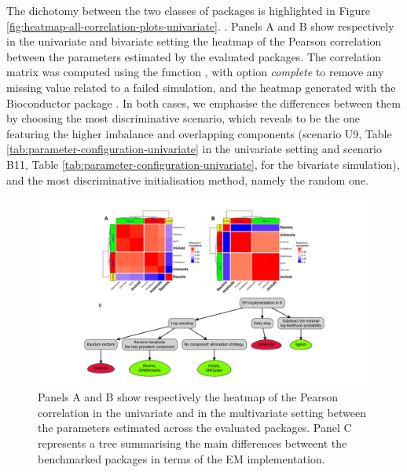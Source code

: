 The dichotomy between the two classes of packages is highlighted in Figure \ref{fig:heatmap-all-correlation-plots-univariate}.
\color{green}. Panels A and B show respectively in the univariate and bivariate setting the heatmap of the Pearson correlation between the parameters estimated by the evaluated packages. The correlation matrix was computed using the function
, with option \emph{complete} to remove any missing value related to a failed simulation, and the heatmap generated with the Bioconductor package . In both cases, we emphasise the differences between them by choosing the most discriminative scenario, which reveals to be the one featuring the higher imbalance and overlapping components (scenario U9, Table \ref{tab:parameter-configuration-univariate} in the univariate setting and scenario B11, Table \ref{tab:parameter-configuration-univariate}, for the bivariate simulation), and the most discriminative initialisation method, namely the random one.

\begin{figure}

{\centering \includegraphics[width=1\linewidth]{./figs/dichotomy_package_conclusion} 

}

\caption{Panels A and B show respectively the heatmap of the Pearson correlation in the univariate and in the multivariate setting between the parameters estimated across the evaluated packages. Panel C represents a tree summarising the main differences betweent the benchmarked packages in terms of the EM implementation.}\label{fig:dichotomy-package-conclusion}
\end{figure}

